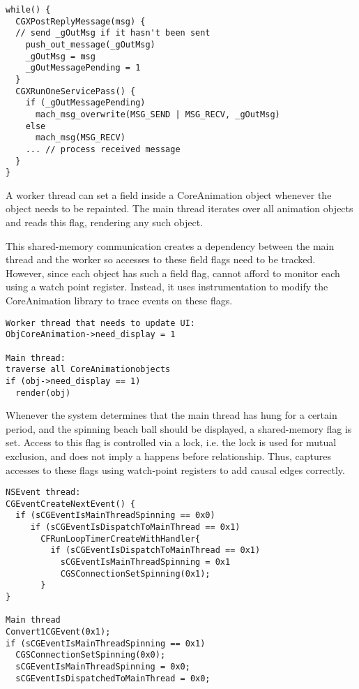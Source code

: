 {\footnotesize \begin{verbatim}
while() {
  CGXPostReplyMessage(msg) {
  // send _gOutMsg if it hasn't been sent
    push_out_message(_gOutMsg)
    _gOutMsg = msg
    _gOutMessagePending = 1
  }
  CGXRunOneServicePass() {
    if (_gOutMessagePending)
      mach_msg_overwrite(MSG_SEND | MSG_RECV, _gOutMsg)
    else
      mach_msg(MSG_RECV)
    ... // process received message
  }
}
\end{verbatim}
}

A worker thread can set a field  inside a CoreAnimation object
whenever the object needs to be repainted. The main thread iterates over all
animation objects and reads this flag, rendering any such object.

This shared-memory communication creates a dependency between the main thread
and the worker so accesses to these field flags need to be tracked.  However,
since each object has such a field flag, \xxx cannot afford to monitor each
using a watch point register.  Instead, it uses instrumentation to modify the
CoreAnimation library to trace events on these flags.

{\footnotesize \begin{verbatim}
Worker thread that needs to update UI:
ObjCoreAnimation->need_display = 1

Main thread: 
traverse all CoreAnimationobjects
if (obj->need_display == 1)
  render(obj)

\end{verbatim}
}

Whenever the system determines that the main thread has hung for a certain
period, and the spinning beach ball should be displayed, a shared-memory flag
is set. Access to this flag is controlled via a lock, i.e. the lock is used for
mutual exclusion, and does not imply a happens before relationship.  Thus, \xxx
captures accesses to these flags using watch-point registers to add causal
edges correctly.

{\footnotesize \begin{verbatim}
NSEvent thread:
CGEventCreateNextEvent() {
  if (sCGEventIsMainThreadSpinning == 0x0)
     if (sCGEventIsDispatchToMainThread == 0x1)
       CFRunLoopTimerCreateWithHandler{
         if (sCGEventIsDispatchToMainThread == 0x1)
           sCGEventIsMainThreadSpinning = 0x1
           CGSConnectionSetSpinning(0x1);
       }
}

Main thread
Convert1CGEvent(0x1);
if (sCGEventIsMainThreadSpinning == 0x1)
  CGSConnectionSetSpinning(0x0);
  sCGEventIsMainThreadSpinning = 0x0;
  sCGEventIsDispatchedToMainThread = 0x0;
\end{verbatim}
}

